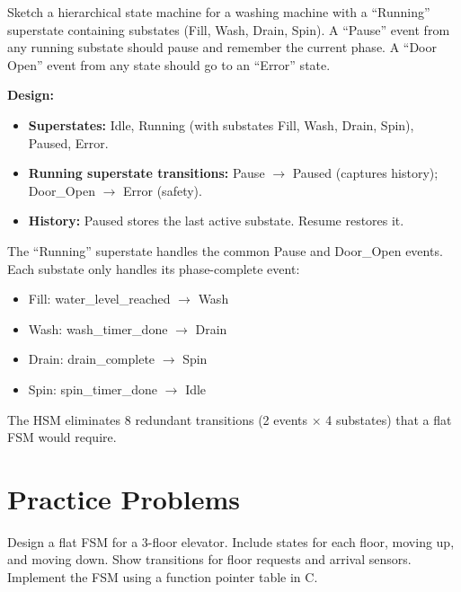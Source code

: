 \begin{example}
Sketch a hierarchical state machine for a washing machine with a ``Running'' superstate containing substates (Fill, Wash, Drain, Spin). A ``Pause'' event from any running substate should pause and remember the current phase. A ``Door Open'' event from any state should go to an ``Error'' state.

\begin{solution}
\textbf{Design:}
\begin{itemize}[nosep]
  \item \textbf{Superstates:} Idle, Running (with substates Fill, Wash, Drain, Spin), Paused, Error.
  \item \textbf{Running superstate transitions:} Pause $\to$ Paused (captures history); Door\_Open $\to$ Error (safety).
  \item \textbf{History:} Paused stores the last active substate. Resume restores it.
\end{itemize}

The ``Running'' superstate handles the common Pause and Door\_Open events. Each substate only handles its phase-complete event:
\begin{itemize}[nosep]
  \item Fill: water\_level\_reached $\to$ Wash
  \item Wash: wash\_timer\_done $\to$ Drain
  \item Drain: drain\_complete $\to$ Spin
  \item Spin: spin\_timer\_done $\to$ Idle
\end{itemize}

The HSM eliminates 8 redundant transitions (2 events $\times$ 4 substates) that a flat FSM would require.
\end{solution}
\end{example}

\section{Practice Problems}
\label{sec:mod:practice}

\begin{exercise}
Design a flat FSM for a 3-floor elevator. Include states for each floor, moving up, and moving down. Show transitions for floor requests and arrival sensors. Implement the FSM using a function pointer table in C.
\end{exercise}


